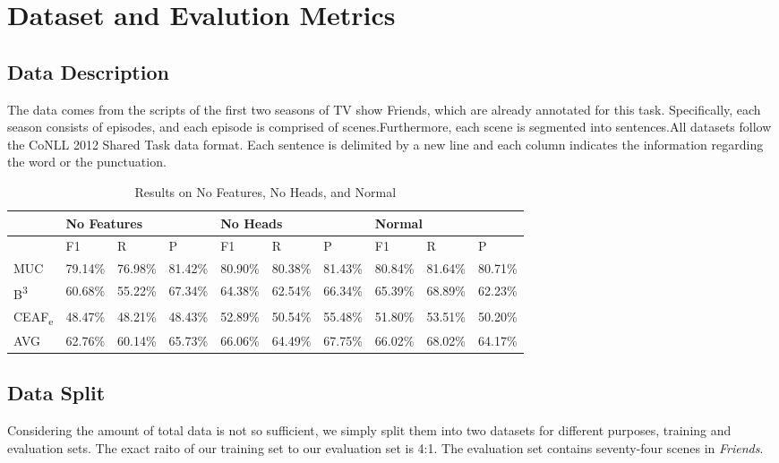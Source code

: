 \documentclass[11pt]{article}
\begin{document}
\section{Dataset and Evalution Metrics}
\subsection{Data Description}
The data comes from the scripts of the first two seasons of TV show Friends, which are already annotated for this task. Specifically, each season consists of episodes, and each episode is comprised of scenes.Furthermore, each scene is segmented into sentences.All datasets follow the CoNLL 2012 Shared Task data format. Each sentence is delimited by a new line and each column indicates the information regarding the word or the punctuation.
\begin{table}[]
\centering
\label{my-label}
\begin{tabular}{|l|l|l|l|l|l|l|l|l|l|}
\hline
        & \multicolumn{3}{l|}{No Features} & \multicolumn{3}{l|}{No Heads} & \multicolumn{3}{l|}{Normal}   \\ \hline
        & F1       & R   & P  & F1      & R  & P & F1      & R  & P \\ \hline
MUC     & 79.14\%  & 76.98\%  & 81.42\%    & 80.90\% & 80.38\% & 81.43\%   & 80.84\% & 81.64\% & 80.71\%   \\ \hline
B\textsuperscript{3}      & 60.68\%  & 55.22\%  & 67.34\%    & 64.38\% & 62.54\% & 66.34\%   & 65.39\% & 68.89\% & 62.23\%   \\ \hline
CEAF\textsubscript{e} & 48.47\%  & 48.21\%  & 48.43\%    & 52.89\% & 50.54\% & 55.48\%   & 51.80\% & 53.51\% & 50.20\%   \\ \hline
AVG     & 62.76\%  & 60.14\%  & 65.73\%    & 66.06\% & 64.49\% & 67.75\%   & 66.02\% & 68.02\% & 64.17\%   \\ \hline
\end{tabular}
\caption{Results on No Features, No Heads, and Normal}
\end{table}
\subsection{Data Split}
Considering the amount of total data is not so sufficient, we simply split them into two datasets for different purposes, training and evaluation sets. The exact raito of our training set to our evaluation set is 4:1. The evaluation set contains seventy-four scenes in \textit{Friends}.
\end{document}
